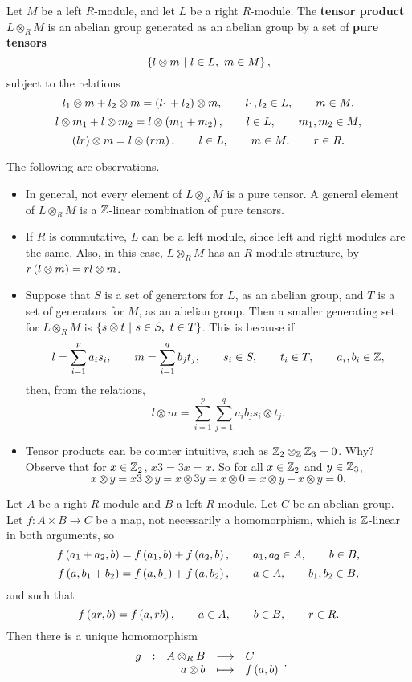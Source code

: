 \begin{definition}
Let $ M $ be a left $ R $-module, and let $ L $ be a right $ R $-module. The \textbf{tensor product} $ L \otimes_R M $ is an abelian group generated as an abelian group by a set of \textbf{pure tensors}
$$ \cbr{l \otimes m \st l \in L, \ m \in M}, $$
subject to the relations
$$ l_1 \otimes m + l_2 \otimes m = \br{l_1 + l_2} \otimes m, \qquad l_1, l_2 \in L, \qquad m \in M, $$
$$ l \otimes m_1 + l \otimes m_2 = l \otimes \br{m_1 + m_2}, \qquad l \in L, \qquad m_1, m_2 \in M, $$
$$ \br{lr} \otimes m = l \otimes \br{rm}, \qquad l \in L, \qquad m \in M, \qquad r \in R. $$
\end{definition}

The following are observations.
\begin{itemize}
\item In general, not every element of $ L \otimes_R M $ is a pure tensor. A general element of $ L \otimes_R M $ is a $ \mathbb{Z} $-linear combination of pure tensors.
\item If $ R $ is commutative, $ L $ can be a left module, since left and right modules are the same. Also, in this case, $ L \otimes_R M $ has an $ R $-module structure, by $ r\br{l \otimes m} = rl \otimes m $.
\item Suppose that $ S $ is a set of generators for $ L $, as an abelian group, and $ T $ is a set of generators for $ M $, as an abelian group. Then a smaller generating set for $ L \otimes_R M $ is $ \cbr{s \otimes t \st s \in S, \ t \in T} $. This is because if
$$ l = \sum_{i = 1}^p a_is_i, \qquad m = \sum_{i = 1}^q b_jt_j, \qquad s_i \in S, \qquad t_i \in T, \qquad a_i, b_i \in \mathbb{Z}, $$
then, from the relations,
$$ l \otimes m = \sum_{i = 1}^p \sum_{j = 1}^q a_ib_js_i \otimes t_j. $$

\pagebreak

\item Tensor products can be counter intuitive, such as $ \mathbb{Z}_2 \otimes_{\mathbb{Z}} \mathbb{Z}_3 = 0 $. Why? Observe that for $ x \in \mathbb{Z}_2 $, $ x3 = 3x = x $. So for all $ x \in \mathbb{Z}_2 $ and $ y \in \mathbb{Z}_3 $,
$$ x \otimes y = x3 \otimes y = x \otimes 3y = x \otimes 0 = x \otimes y - x \otimes y = 0. $$
\end{itemize}


\begin{theorem}
Let $ A $ be a right $ R $-module and $ B $ a left $ R $-module. Let $ C $ be an abelian group. Let $ f : A \times B \to C $ be a map, not necessarily a homomorphism, which is $ \mathbb{Z} $-linear in both arguments, so
$$ f\br{a_1 + a_2, b} = f\br{a_1, b} + f\br{a_2, b}, \qquad a_1, a_2 \in A, \qquad b \in B, $$
$$ f\br{a, b_1 + b_2} = f\br{a, b_1} + f\br{a, b_2}, \qquad a \in A, \qquad b_1, b_2 \in B, $$
and such that
$$ f\br{ar, b} = f\br{a, rb}, \qquad a \in A, \qquad b \in B, \qquad r \in R. $$
Then there is a unique homomorphism
$$ \function[g]{A \otimes_R B}{C}{a \otimes b}{f\br{a, b}}. $$
\end{theorem}

